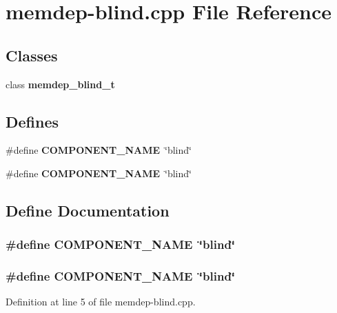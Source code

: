 \section{memdep-blind.cpp File Reference}
\label{memdep-blind_8cpp}
\subsection*{Classes}
\begin{CompactItemize}
\item 
class {\bf memdep\_\-blind\_\-t}
\end{CompactItemize}
\subsection*{Defines}
\begin{CompactItemize}
\item 
\#define {\bf COMPONENT\_\-NAME}~\char`\"{}blind\char`\"{}
\item 
\#define {\bf COMPONENT\_\-NAME}~\char`\"{}blind\char`\"{}
\end{CompactItemize}


\subsection{Define Documentation}
\subsubsection[{COMPONENT\_\-NAME}]{\setlength{\rightskip}{0pt plus 5cm}\#define COMPONENT\_\-NAME~\char`\"{}blind\char`\"{}}\label{zesto-memdep_8cpp_9146ade7ce24e3db226a973a59063892}


\subsubsection[{COMPONENT\_\-NAME}]{\setlength{\rightskip}{0pt plus 5cm}\#define COMPONENT\_\-NAME~\char`\"{}blind\char`\"{}}\label{memdep-blind_8cpp_9146ade7ce24e3db226a973a59063892}




Definition at line 5 of file memdep-blind.cpp.